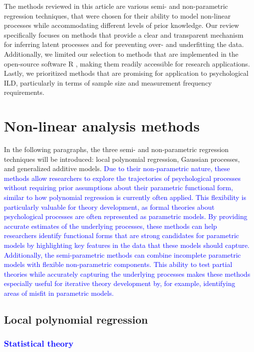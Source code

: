 \documentclass[man, floatsintext]{apa7}
\begin{document}
The methods reviewed in this article are various semi- and non-parametric
regression techniques, that were chosen for their ability to model non-linear
processes
while accommodating different levels of prior knowledge. Our review
specifically focuses on methods that provide a clear and transparent mechanism
for inferring latent processes and for preventing
over- and underfitting the data. Additionally, we limited our
selection to methods that are implemented in the open-source software R
\parencite{R-base}, making them readily accessible for research applications.
Lastly, we prioritized methods that are promising for application to
psychological ILD, particularly in terms of sample
size and measurement frequency requirements.

\section{Non-linear analysis methods}\label{method_introduction}

In the following paragraphs, the three semi- and non-parametric regression
techniques will be introduced: local polynomial regression, Gaussian processes,
and generalized additive models. \textcolor{blue}{
  Due to their non-parametric nature, these methods allow researchers to
  explore
  the trajectories of psychological processes without requiring prior
  assumptions
  about their parametric functional form, similar to how polynomial regression
  is
  currently often applied. This flexibility is particularly valuable for theory
  development, as formal theories about psychological processes are often
  represented as parametric models. By providing accurate estimates of the
  underlying processes, these methods can help researchers identify functional
  forms that are strong candidates for parametric models by highlighting key
  features in the data that these models should capture.
  Additionally, the semi-parametric methods can combine incomplete parametric
  models with flexible non-parametric components. This ability to test partial
  theories while accurately capturing the underlying processes makes these
  methods especially useful for iterative theory development by, for example,
  identifying areas of misfit in parametric models.}

\subsection{Local polynomial regression}

\subsubsection{\textcolor{blue}{Statistical theory}}
\end{document}
